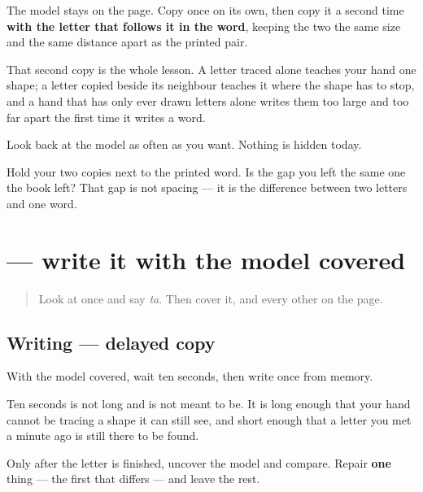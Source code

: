 The model stays on the page. Copy \textbf{} once on its own, then copy it a second time \textbf{with the letter that follows it in the word}, keeping the two the same size and the same distance apart as the printed pair.

That second copy is the whole lesson. A letter traced alone teaches your hand one shape; a letter copied beside its neighbour teaches it where the shape has to stop, and a hand that has only ever drawn letters alone writes them too large and too far apart the first time it writes a word.

Look back at the model as often as you want. Nothing is hidden today.

\begin{tcolorbox}[breakable,colback=teal!4,colframe=teal!35!black,title={Before you move on}]
Hold your two copies next to the printed word. Is the gap you left the same one the book left? That gap is not spacing — it is the difference between two letters and one word.
\end{tcolorbox}
\section[\texorpdfstring{\te{త} (ta)}{త (ta)}]{ — write it with the model covered}

\label{lesson:TE-S01-delayed-copy}



\begin{quote}
Look at \textbf{} once and say \emph{ta}. Then cover it, and every other \textbf{} on the page.
\end{quote}

\subsection*{Writing — delayed copy}

With the model covered, wait ten seconds, then write \textbf{} once from memory.

Ten seconds is not long and is not meant to be. It is long enough that your hand cannot be tracing a shape it can still see, and short enough that a letter you met a minute ago is still there to be found.

Only after the letter is finished, uncover the model and compare. Repair \textbf{one} thing — the first that differs — and leave the rest.

